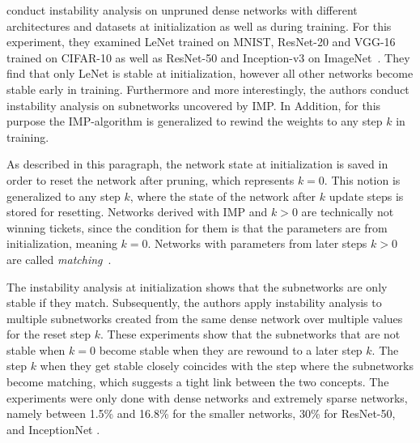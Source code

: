\textcite{LinearModeConnectivity} conduct instability analysis on unpruned dense networks with different architectures and datasets at initialization as well as during training.
For this experiment, they examined LeNet trained on MNIST, ResNet-20 and VGG-16 trained on CIFAR-10 as well as ResNet-50 and Inception-v3 \autocite{inceptionv3} on ImageNet~\autocite{imagenet}. 
They find that only LeNet is stable at initialization, however all other networks become stable early in training.
Furthermore and more interestingly, the authors conduct instability analysis on subnetworks uncovered by {IMP}.
In Addition, for this purpose the {IMP}-algorithm is generalized to rewind the weights to any step $k$ in training.

As described in this paragraph, the network state at initialization is saved in order to reset the network after pruning, which represents $k=0$.
This notion is generalized to any step $k$, where the state of the network after $k$ update steps is stored for resetting.
Networks derived with {IMP} and $k > 0$ are technically not winning tickets, since the condition for them is that the parameters are from initialization, meaning $k=0$.
Networks with parameters from later steps $k > 0$ are called \textit{matching}~\autocite{LinearModeConnectivity}.

The instability analysis at initialization shows that the subnetworks are only stable if they match.
Subsequently, the authors apply instability analysis to multiple subnetworks created from the same dense network over multiple values for the reset step $k$.
These experiments show that the subnetworks that are not stable when $k=0$ become stable when they are rewound to a later step $k$.
The step $k$ when they get stable closely coincides with the step where the subnetworks become matching, which suggests a tight link between the two concepts.
The experiments were only done with dense networks and extremely sparse networks, namely between 1.5\% and 16.8\% for the smaller networks, 30\% for ResNet-50, and InceptionNet \autocite{LinearModeConnectivity}.

